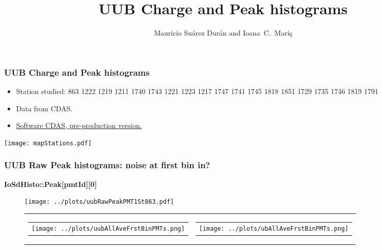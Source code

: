 \documentclass[aspectratio=169]{beamer}
\title{UUB Charge and Peak histograms}
\author{
  Mauricio Su\'arez Dur\'an and Ioana~C.~Mari\c{s}
}
\institute{IIHE-ULB}
\begin{document}
\begin{frame}
  \titlepage
\end{frame}


\begin{frame}
	\frametitle{UUB Charge and Peak histograms}
	\begin{itemize}
		\item Station studied: 863 1222 1219 1211 1740 1743 1221 1223 1217 1747 1741 1745 1818 1851 1729 1735 1746 1819 1791
		\item Data from CDAS.
		\item {\underline {Software CDAS, pre-production version.}}
	\end{itemize}
	\centering
	\texttt{[image: mapStations.pdf]}
\end{frame}



\begin{frame}
  \frametitle{UUB Raw Peak histograms: noise at first bin in? }
  {\bf IoSdHisto::Peak[pmtId][0]}
	\begin{figure}
		\centering
    \texttt{[image: ../plots/uubRawPeakPMT1St863.pdf]}
		\begin{tabularx}{\textwidth}{CC}
			\begin{tabular}{l}
				\texttt{[image: ../plots/uubAllAveFrstBinPMTs.png]}
			\end{tabular}
			&
			\begin{tabular}{l}
				\texttt{[image: ../plots/ubAllAveFrstBinPMTs.png]}
			\end{tabular} 
		\end{tabularx}
	\end{figure}
\end{frame}
\end{document}
